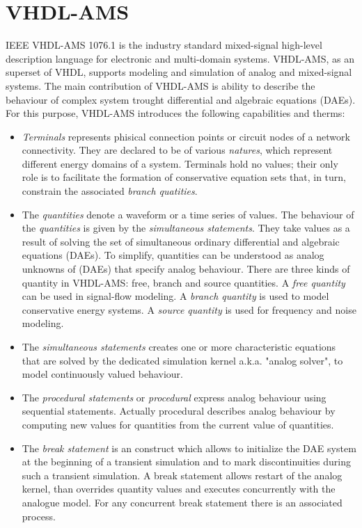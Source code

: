 \documentclass{article}
\begin{document}
\section{VHDL-AMS}
\label{sec:vhdlams}
IEEE VHDL-AMS 1076.1 is the industry standard mixed-signal
high-level description language for electronic and multi-domain
systems. VHDL-AMS, as an superset of VHDL, supports modeling and
simulation of analog and mixed-signal systems. The main contribution
of VHDL-AMS is ability to describe the behaviour of complex system
trought differential and algebraic equations (DAEs). For this purpose,
VHDL-AMS introduces the following capabilities and therms:

\begin{itemize}
\item
\emph{Terminals} represents phisical connection points or circuit nodes
of a network connectivity. They are declared to be of various
\emph{natures}, which represent different energy domains of a system.
Terminals hold no values; their only role is to facilitate the formation
of conservative equation sets that, in turn, constrain the associated
\emph{branch quatities}.
\item
The \emph{quantities} denote a waveform or a time series of values.
The behaviour of the \emph{quantities} is given by the \emph{simultaneous
 statements}. They take values as a result of solving the set of simultaneous
ordinary differential and algebraic equations (DAEs). To simplify,
quantities can be understood as analog unknowns of (DAEs) that specify
analog behaviour. There are three kinds of quantity in VHDL-AMS: free,
branch and source quantities. A \emph{free quantity} can be used in
signal-flow modeling. A \emph{branch quantity} is used to model conservative energy
systems. A \emph{source quantity} is used for frequency and noise modeling.
\item
The \emph{simultaneous statements} creates one or more characteristic
equations that are solved by the dedicated simulation kernel a.k.a.
"analog solver", to model continuously valued behaviour. 
\item
The \emph{procedural statements} or \emph{procedural} express analog behaviour
using sequential statements. Actually procedural describes analog behaviour
by computing new values for quantities from the current value of quantities.
\item
The \emph{break statement} is an construct which allows to
initialize the DAE system at the beginning of a transient
simulation and to mark discontinuities during such a transient
simulation. A break statement allows restart of the analog kernel,
than overrides quantity values and executes concurrently with the analogue model.
For any concurrent break statement there is an associated process.
\end{itemize}
 
\end{document}
